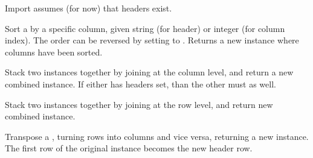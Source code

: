 \documentclass[a4paper,12pt,english]{sphinxmanual}
\begin{document}
\begin{fulllineitems}
\begin{fulllineitems}
Import assumes (for now) that headers exist.

\end{fulllineitems}


\begin{fulllineitems}
\label{api:tablib.Dataset.sort}
Sort a {\hyperref[api:tablib.Dataset]{}} by a specific column, given string (for
header) or integer (for column index). The order can be reversed by
setting  to . 
Returns a new {\hyperref[api:tablib.Dataset]{}} instance where columns have been
sorted.

\end{fulllineitems}


\begin{fulllineitems}
\label{api:tablib.Dataset.stack_columns}
Stack two {\hyperref[api:tablib.Dataset]{}} instances together by
joining at the column level, and return a new
combined  instance. If either 
has headers set, than the other must as well.

\end{fulllineitems}


\begin{fulllineitems}
\label{api:tablib.Dataset.stack_rows}
Stack two {\hyperref[api:tablib.Dataset]{}} instances together by
joining at the row level, and return new combined
 instance.

\end{fulllineitems}


\begin{fulllineitems}
\label{api:tablib.Dataset.transpose}
Transpose a {\hyperref[api:tablib.Dataset]{}}, turning rows into columns and vice
versa, returning a new  instance. The first row of the
original instance becomes the new header row.

\end{fulllineitems}


\end{fulllineitems}
\end{document}
